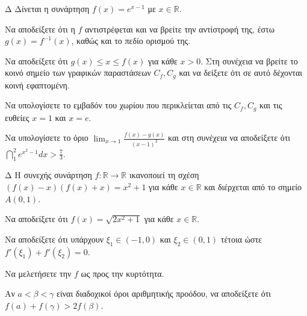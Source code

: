 \begin{thema}{Δ}
Δίνεται η συνάρτηση $f(x) = e^{x-1}$ με $x \in \mathbb{R}$.
\begin{erwthma}
    \item Να αποδείξετε ότι η $f$ αντιστρέφεται και να βρείτε την αντίστροφή της, έστω $g(x) = f^{-1}(x)$, καθώς και το πεδίο ορισμού της.
    \item Να αποδείξετε ότι $g(x) \le x \le f(x)$ για κάθε $x>0$. Στη συνέχεια να βρείτε το κοινό σημείο των γραφικών παραστάσεων $C_f, C_g$ και να δείξετε ότι σε αυτό δέχονται κοινή εφαπτομένη.
    \item Να υπολογίσετε το εμβαδόν του χωρίου που περικλείεται από τις $C_f, C_g$ και τις ευθείες $x=1$ και $x=e$.
    \item Να υπολογίσετε το όριο $\displaystyle \lim_{x\to 1} \frac{f(x) - g(x)}{(x-1)^2}$ και στη συνέχεια να αποδείξετε ότι $\displaystyle \dint_1^2 e^{x^2-1} dx > \frac{7}{3}$.
\end{erwthma}
\end{thema}

\begin{thema}{Δ}
H συνεχής συνάρτηση $f:\mathbb{R}\to\mathbb{R}$ ικανοποιεί τη σχέση $(f(x) - x)(f(x) + x) = x^2 + 1$ για κάθε $x \in \mathbb{R}$ και διέρχεται από το σημείο $A(0, 1)$.
\begin{erwthma}
    \item Να αποδείξετε ότι $f(x) = \sqrt{2x^2 + 1}$ για κάθε $x \in \mathbb{R}$.
    \item Να αποδείξετε ότι υπάρχουν $\xi_1 \in (-1, 0)$ και $\xi_2 \in (0, 1)$ τέτοια ώστε $f'(\xi_1) + f'(\xi_2) = 0$.
    \item Να μελετήσετε την $f$ ως προς την κυρτότητα.
    \item Αν $a < \beta < \gamma$ είναι διαδοχικοί όροι αριθμητικής προόδου, να αποδείξετε ότι $f(a) + f(\gamma) > 2f(\beta)$.
\end{erwthma}
\end{thema}

